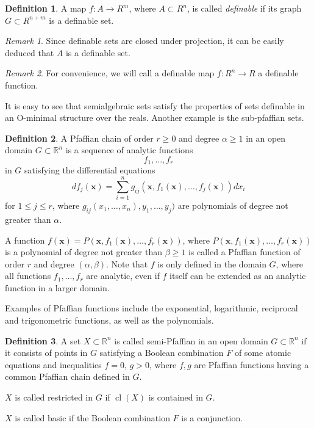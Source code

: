 \documentclass[
]{book}
\theoremstyle{definition}
\newtheorem{definition}{Definition}[chapter]
\theoremstyle{definition}
\theoremstyle{definition}
\theoremstyle{definition}
\theoremstyle{remark}
\newtheorem*{remark}{Remark}
\begin{document}
\begin{definition}
\protect\hypertarget{def:definable-function}{}\label{def:definable-function}A map \(f : A \to R^m\), where \(A \subset R^n\), is called \emph{definable} if its graph \(G \subset R^{n+m}\) is a definable set.
\end{definition}

\begin{remark}
Since definable sets are closed under projection, it can be easily deduced that \(A\) is a definable set.
\end{remark}

\begin{remark}
For convenience, we will call a definable map \(f : R^n \to R\) a definable function.
\end{remark}

It is easy to see that semialgebraic sets satisfy the properties of sets definable in an O-minimal structure over the reals. Another example is the sub-pfaffian sets.

\begin{definition}
\citep[Definition 2.1]{gv04}
A Pfaffian chain of order \(r \ge 0\) and degree \(\alpha \ge 1\) in an open domain \(G \subset \mathbb{R}^n\) is a sequence of analytic functions
\[
f_1, \ldots , f_r
\]
in \(G\) satisfying the differential equations
\[
{df}_j(\mathbf{x}) = \sum^n_{i=1} g_{ij}(\mathbf{x}, f_1(\mathbf{x}), \ldots, f_j(\mathbf{x})) dx_i
\]
for \(1 \le j \le r\), where \(g_{ij}(x_1,\ldots,x_n),y_1,\ldots,y_j)\) are polynomials of degree not greater than \(\alpha\).

A function \(f(\mathbf{x}) = P(\mathbf{x},f_1(\mathbf{x}),\ldots,f_r(\mathbf{x}))\), where \(P(\mathbf{x}, f_1(\mathbf{x}), \ldots, f_r(\mathbf{x}))\) is a polynomial of degree not greater than \(\beta \ge 1\) is called a Pfaffian function of order \(r\) and degree \((\alpha, \beta)\). Note that \(f\) is only defined in the domain \(G\), where all functions \(f_1,\ldots,f_r\) are analytic, even if \(f\) itself can be extended as an analytic function in a larger domain.
\end{definition}

Examples of Pfaffian functions include the exponential, logarithmic, reciprocal and trigonometric functions, as well as the polynomials.

\begin{definition}
\citep[Definition 2.7]{gv04}
A set \(X \subset \mathbb{R}^n\) is called semi-Pfaffian in an open domain
\(G \subset \mathbb{R}^n\) if it consists of points in \(G\) satisfying a Boolean combination \(F\) of some atomic equations and inequalities \(f = 0\), \(g > 0\), where \(f, g\) are Pfaffian functions having a common Pfaffian chain defined in \(G\).

\(X\) is called restricted in \(G\) if \({\operatorname{cl} \left( X \right)}\) is contained in \(G\).

\(X\) is called basic if the Boolean combination \(F\) is a conjunction.
\end{definition}
\end{document}
